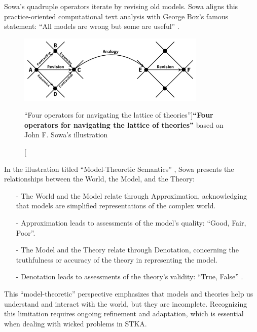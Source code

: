 Sowa's quadruple operators iterate by revising old models. Sowa aligns this practice-oriented computational text analysis with George Box's famous statement: ``All models are wrong but some are useful” \citep[p. 202]{box_robustness_1979} \citep[p. 25]{sowa_semantics_2013}.

\begin{figure}[h]
    \centering
    \includegraphics[width=0.8\textwidth]{figures/f2.png}
    \caption[``Four operators for navigating the lattice of theories”]{\textbf{``Four operators for navigating the lattice of theories”} based on John F. Sowa’s illustration \citep[p. 11]{sowa_language_2007} }
    \label{f2}
\end{figure}
\par
\FloatBarrier
\clearpage
\par
In the illustration titled ``Model-Theoretic Semantics” \citep[p. 25]{sowa_semantics_2013}, Sowa presents the relationships between the World, the Model, and the Theory:
\begin{enumerate}
    \item[-] The World and the Model relate through Approximation, acknowledging that models are simplified representations of the complex world.
    \item[-] Approximation leads to assessments of the model's quality: ``{Good, Fair, Poor}”.
    \item[-] The Model and the Theory relate through Denotation, concerning the truthfulness or accuracy of the theory in representing the model.
    \item[-] Denotation leads to assessments of the theory's validity: ``{True, False}” \citep[p. 25]{sowa_semantics_2013}. 
\end{enumerate}

This “model-theoretic” \citep[p. 25]{sowa_semantics_2013} perspective emphasizes that models and theories help us understand and interact with the world, but they are incomplete. Recognizing this limitation requires ongoing refinement and adaptation, which is essential when dealing with wicked problems in STKA.

